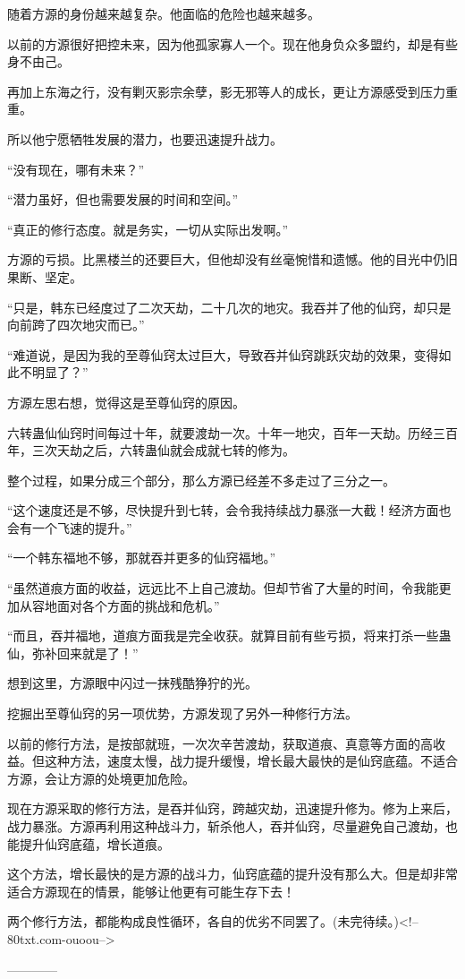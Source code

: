 \begin{this_body}
随着方源的身份越来越复杂。他面临的危险也越来越多。

以前的方源很好把控未来，因为他孤家寡人一个。现在他身负众多盟约，却是有些身不由己。

再加上东海之行，没有剿灭影宗余孽，影无邪等人的成长，更让方源感受到压力重重。

所以他宁愿牺牲发展的潜力，也要迅速提升战力。

“没有现在，哪有未来？”

“潜力虽好，但也需要发展的时间和空间。”

“真正的修行态度。就是务实，一切从实际出发啊。”

方源的亏损。比黑楼兰的还要巨大，但他却没有丝毫惋惜和遗憾。他的目光中仍旧果断、坚定。

“只是，韩东已经度过了二次天劫，二十几次的地灾。我吞并了他的仙窍，却只是向前跨了四次地灾而已。”

“难道说，是因为我的至尊仙窍太过巨大，导致吞并仙窍跳跃灾劫的效果，变得如此不明显了？”

方源左思右想，觉得这是至尊仙窍的原因。

六转蛊仙仙窍时间每过十年，就要渡劫一次。十年一地灾，百年一天劫。历经三百年，三次天劫之后，六转蛊仙就会成就七转的修为。

整个过程，如果分成三个部分，那么方源已经差不多走过了三分之一。

“这个速度还是不够，尽快提升到七转，会令我持续战力暴涨一大截！经济方面也会有一个飞速的提升。”

“一个韩东福地不够，那就吞并更多的仙窍福地。”

“虽然道痕方面的收益，远远比不上自己渡劫。但却节省了大量的时间，令我能更加从容地面对各个方面的挑战和危机。”

“而且，吞并福地，道痕方面我是完全收获。就算目前有些亏损，将来打杀一些蛊仙，弥补回来就是了！”

想到这里，方源眼中闪过一抹残酷狰狞的光。

挖掘出至尊仙窍的另一项优势，方源发现了另外一种修行方法。

以前的修行方法，是按部就班，一次次辛苦渡劫，获取道痕、真意等方面的高收益。但这种方法，速度太慢，战力提升缓慢，增长最大最快的是仙窍底蕴。不适合方源，会让方源的处境更加危险。

现在方源采取的修行方法，是吞并仙窍，跨越灾劫，迅速提升修为。修为上来后，战力暴涨。方源再利用这种战斗力，斩杀他人，吞并仙窍，尽量避免自己渡劫，也能提升仙窍底蕴，增长道痕。

这个方法，增长最快的是方源的战斗力，仙窍底蕴的提升没有那么大。但是却非常适合方源现在的情景，能够让他更有可能生存下去！

两个修行方法，都能构成良性循环，各自的优劣不同罢了。(未完待续。)<!--80txt.com-ouoou-->

------------

\end{this_body}

